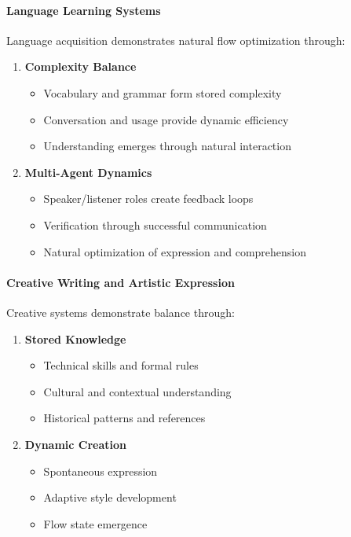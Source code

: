 \documentclass[12pt]{article}
\begin{document}
\paragraph{Language Learning Systems}
Language acquisition demonstrates natural flow optimization through:
\begin{enumerate}
    \item \textbf{Complexity Balance}
    \begin{itemize}
        \item Vocabulary and grammar form stored complexity
        \item Conversation and usage provide dynamic efficiency
        \item Understanding emerges through natural interaction
    \end{itemize}
    
    \item \textbf{Multi-Agent Dynamics}
    \begin{itemize}
        \item Speaker/listener roles create feedback loops
        \item Verification through successful communication
        \item Natural optimization of expression and comprehension
    \end{itemize}
\end{enumerate}

\paragraph{Creative Writing and Artistic Expression}
Creative systems demonstrate balance through:
\begin{enumerate}
    \item \textbf{Stored Knowledge}
    \begin{itemize}
        \item Technical skills and formal rules
        \item Cultural and contextual understanding
        \item Historical patterns and references
    \end{itemize}
    
    \item \textbf{Dynamic Creation}
    \begin{itemize}
        \item Spontaneous expression
        \item Adaptive style development
        \item Flow state emergence
    \end{itemize}
\end{enumerate}
\end{document}
